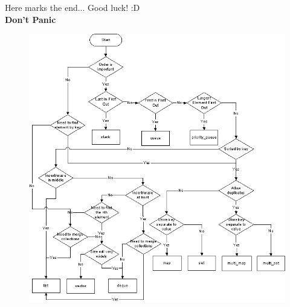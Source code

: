 \documentclass[a4paper]{article}
\begin{document}
	\vspace{5mm}
	
	\begin{center}
		Here marks the end... Good luck! :D \\
		\vspace{5mm}
		{\Huge \textbf{Don't Panic}}
	\end{center}
	
	\begin{figure}[ht!]
		\includegraphics[width=\textwidth]{d5CDK.png}
	\end{figure}
	
\end{document}
